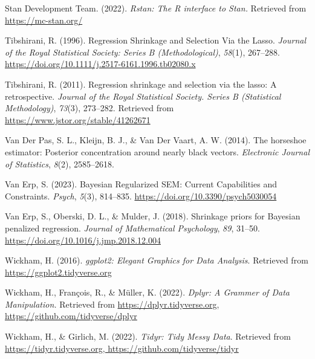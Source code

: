 \documentclass[
  man, donotrepeattitle,floatsintext]{apa6}
\newlength{\cslhangindent}
\newenvironment{CSLReferences}[2] %
 {\begin{list}{}{%
  \setlength{\itemindent}{0pt}
  \setlength{\leftmargin}{0pt}
  \setlength{\parsep}{0pt}
  \ifodd #1
   \setlength{\leftmargin}{\cslhangindent}
   \setlength{\itemindent}{-1\cslhangindent}
  \fi
  \setlength{\itemsep}{#2\baselineskip}}}
 {\end{list}}
\begin{document}
\begin{CSLReferences}{1}{0}
Stan Development Team. (2022). \emph{Rstan: The {R} interface to {Stan}.} Retrieved from \url{https://mc-stan.org/}

Tibshirani, R. (1996). Regression {Shrinkage} and {Selection} {Via} the {Lasso}. \emph{Journal of the Royal Statistical Society: Series B (Methodological)}, \emph{58}(1), 267--288. \url{https://doi.org/10.1111/j.2517-6161.1996.tb02080.x}

Tibshirani, R. (2011). Regression shrinkage and selection via the lasso: A retrospective. \emph{Journal of the Royal Statistical Society. Series B (Statistical Methodology)}, \emph{73}(3), 273--282. Retrieved from \url{https://www.jstor.org/stable/41262671}

Van Der Pas, S. L., Kleijn, B. J., \& Van Der Vaart, A. W. (2014). The horseshoe estimator: {Posterior} concentration around nearly black vectors. \emph{Electronic Journal of Statistics}, \emph{8}(2), 2585--2618.

Van Erp, S. (2023). Bayesian {Regularized} {SEM}: {Current} {Capabilities} and {Constraints}. \emph{Psych}, \emph{5}(3), 814--835. \url{https://doi.org/10.3390/psych5030054}

Van Erp, S., Oberski, D. L., \& Mulder, J. (2018). Shrinkage priors for {Bayesian} penalized regression. \emph{Journal of Mathematical Psychology}, \emph{89}, 31--50. \url{https://doi.org/10.1016/j.jmp.2018.12.004}

Wickham, H. (2016). \emph{ggplot2: {Elegant} {Graphics} for {Data} {Analysis}}. Retrieved from \url{https://ggplot2.tidyverse.org}

Wickham, H., François, R., \& Müller, K. (2022). \emph{Dplyr: {A} {Grammer} of {Data} {Manipulation}.} Retrieved from \href{https://dplyr.tidyverse.org,\%20https://github.com/tidyverse/dplyr}{https://dplyr.tidyverse.org, https://github.com/tidyverse/dplyr}

Wickham, H., \& Girlich, M. (2022). \emph{Tidyr: {Tidy} {Messy} {Data}}. Retrieved from \href{https://tidyr.tidyverse.org,\%20https://github.com/tidyverse/tidyr}{https://tidyr.tidyverse.org, https://github.com/tidyverse/tidyr}


\end{CSLReferences}
\end{document}
